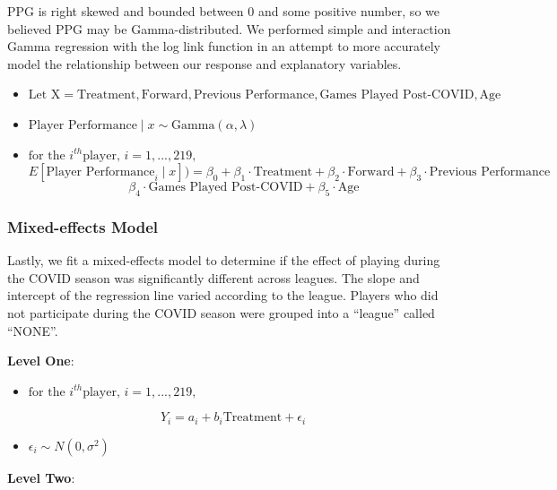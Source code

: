 \documentclass[12pt]{article}
\providecommand{\tightlist}{%
  \setlength{\itemsep}{0pt}\setlength{\parskip}{0pt}}
\begin{document}
PPG is right skewed and bounded between 0 and some positive number, so
we believed PPG may be Gamma-distributed. We performed simple and
interaction Gamma regression with the log link function in an attempt to
more accurately model the relationship between our response and
explanatory variables.

\vspace{-.5cm}

\begin{itemize}
\tightlist
\item
  \(\text{Let X} = \text{Treatment}, \text{Forward}, \text{Previous Performance}, \text{Games Played Post-COVID}, \text{Age}\)
\item
  \(\text{Player Performance} \mid x \sim \text{Gamma}(\alpha, \lambda)\)
\item
  \(\text{for the }i^{th} \text{player, } i= 1,..., 219,\)
  \[E[\text{Player Performance}_i \mid x]) =  \beta_0 + \beta_1 \cdot \text{Treatment} + \beta_2 \cdot \text{Forward} + \beta_3 \cdot \text{Previous Performance}\]
  \[ \beta_4 \cdot \text{Games Played Post-COVID} + \beta_5 \cdot \text{Age}\]
\end{itemize}

\hypertarget{mixed-effects-model}{%
\subsubsection{Mixed-effects Model}\label{mixed-effects-model}}

Lastly, we fit a mixed-effects model to determine if the effect of
playing during the COVID season was significantly different across
leagues. The slope and intercept of the regression line varied according
to the league. Players who did not participate during the COVID season
were grouped into a ``league'' called ``NONE''.

\textbf{Level One}:

\begin{itemize}
\tightlist
\item
  \(\text{for the }i^{th} \text{player, } i= 1,..., 219,\)
\end{itemize}

\[Y_i = a_i + b_i\text{Treatment} + \epsilon_i\]

\begin{itemize}
\tightlist
\item
  \(\epsilon_i \sim N(0, \sigma^2)\)
\end{itemize}

\textbf{Level Two}:
\end{document}
